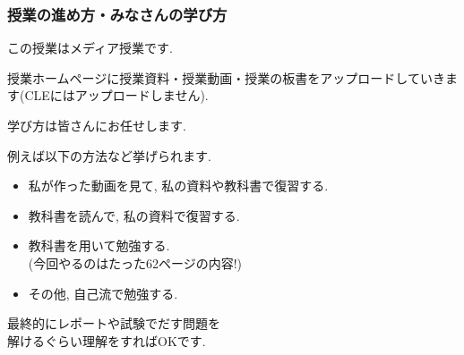 \documentclass[11pt,dvipdfmx]{beamer}
\theoremstyle{definition}
\theoremstyle{remark}
\begin{document}
\begin{frame}
\frametitle{授業の進め方・みなさんの学び方}
この授業はメディア授業です. %

 授業ホームページに授業資料・授業動画・授業の板書をアップロードしていきます(CLEにはアップロードしません).
 \begin{alertblock}{}
  \begin{center}
学び方は皆さんにお任せします.
  \end{center}
 
 \end{alertblock}
 例えば以下の方法など挙げられます.
  \begin{itemize}
    \item 私が作った動画を見て, 私の資料や教科書で復習する.  \\
  \item 教科書を読んで, 私の資料で復習する. \\
  \item 教科書を用いて勉強する. \\ (今回やるのはたった62ページの内容!)
  \item その他, 自己流で勉強する.
  \end{itemize}

  \begin{alertblock}{}
  \begin{center}
最終的にレポートや試験でだす問題を \\ 解けるぐらい理解をすればOKです.
  \end{center}
 \end{alertblock}


\end{frame}
\end{document}

